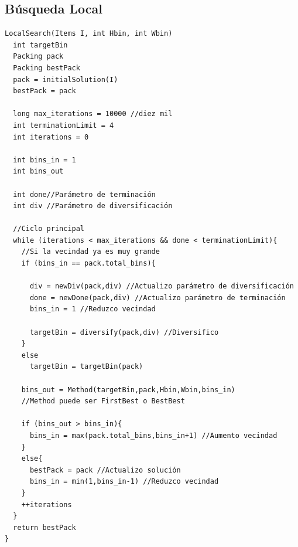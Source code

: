 \documentclass[a4paper,10pt]{article}
\begin{document}
\subsection{Búsqueda Local}
\begin{verbatim}
LocalSearch(Items I, int Hbin, int Wbin)                                                                                 
  int targetBin                                                                                                                                  
  Packing pack                                                                                                                                               
  Packing bestPack                                                                                                                                          
  pack = initialSolution(I)                                                                                                                         
  bestPack = pack                                                                                                                                           
                                                                                                                                                             
  long max_iterations = 10000 //diez mil
  int terminationLimit = 4
  int iterations = 0

  int bins_in = 1
  int bins_out

  int done//Parámetro de terminación
  int div //Parámetro de diversificación

  //Ciclo principal
  while (iterations < max_iterations && done < terminationLimit){
    //Si la vecindad ya es muy grande
    if (bins_in == pack.total_bins){
      
      div = newDiv(pack,div) //Actualizo parámetro de diversificación
      done = newDone(pack,div) //Actualizo parámetro de terminación
      bins_in = 1 //Reduzco vecindad  

      targetBin = diversify(pack,div) //Diversifico
    }
    else
      targetBin = targetBin(pack)

    bins_out = Method(targetBin,pack,Hbin,Wbin,bins_in)
    //Method puede ser FirstBest o BestBest

    if (bins_out > bins_in){
      bins_in = max(pack.total_bins,bins_in+1) //Aumento vecindad
    }
    else{ 
      bestPack = pack //Actualizo solución
      bins_in = min(1,bins_in-1) //Reduzco vecindad
    }
    ++iterations
  }
  return bestPack
}
\end{verbatim}
\end{document}

